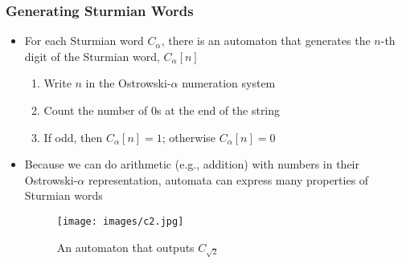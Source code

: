 \documentclass[leqno,presentation]{beamer}
\begin{document}

\begin{frame}
    \frametitle{Generating Sturmian Words}
    \begin{itemize}
        \item For each Sturmian word $C_{\alpha}$, there is an automaton that generates the $n$-th digit of the Sturmian word, $C_{\alpha}[n]$
            \begin{enumerate}
                \item Write $n$ in the Ostrowski-$\alpha$ numeration system
                \item Count the number of $0$s at the end of the string
                \item If odd, then $C_{\alpha}[n] = 1$; otherwise $C_{\alpha}[n] = 0$
            \end{enumerate}
            
        \item Because we can do arithmetic (e.g., addition) with numbers in their Ostrowski-$\alpha$ representation, automata can express many properties of Sturmian words
    
        \begin{figure}
            \centering
            \texttt{[image: images/c2.jpg]}
            \caption{An automaton that outputs $C_{\sqrt{2}}$}
            \label{fig:c2}
        \end{figure}
    \end{itemize}
\end{frame}

    
\end{document}
